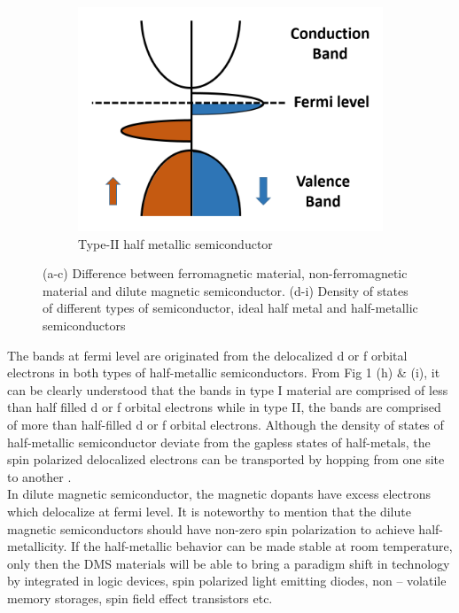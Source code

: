 \documentclass[main.tex]{subfiles}
\begin{document}
\begin{figure}[!htb]
\begin{subfigure}[h]{0.32\textwidth}
  		\includegraphics[width=\linewidth]{dos_half_metallic2}
  		\caption{Type-II half metallic semiconductor}
  		\label{fig:sub-second}
	\end{subfigure}
\caption{(a-c) Difference between ferromagnetic material, non-ferromagnetic material and dilute magnetic semiconductor. (d-i) Density of states of different types of semiconductor, ideal half metal and half-metallic semiconductors}
\label{fig:TEM_PT}

\end{figure}
\FloatBarrier

The bands at fermi level are originated from the delocalized d or f orbital electrons in both types of half-metallic semiconductors. From Fig 1 (h) $\&$ (i), it can be clearly understood that the bands in type I material are comprised of less than half filled d or f orbital electrons while in type II, the bands are comprised of more than half-filled d or f orbital electrons. Although the density of states of half-metallic semiconductor deviate from the gapless states of half-metals, the spin polarized delocalized electrons can be transported by hopping from one site to another \cite{coey2002half}. \\ 

In dilute magnetic semiconductor, the magnetic dopants have excess electrons which delocalize at fermi level. It is noteworthy to mention that the dilute magnetic semiconductors should have non-zero spin polarization to achieve half-metallicity. If the half-metallic behavior can be made stable at room temperature, only then the DMS materials will be able to bring a paradigm shift in technology by integrated in logic devices, spin polarized light emitting diodes, non – volatile memory storages, spin field effect transistors etc. 
\end{document}
